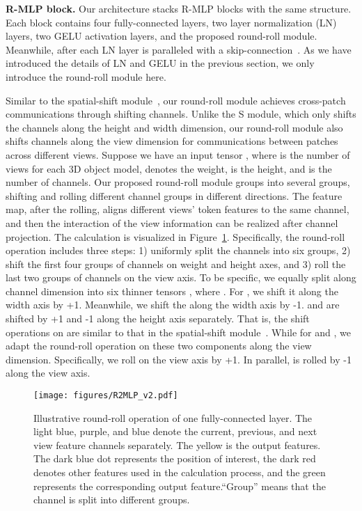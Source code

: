 \documentclass[11pt]{article}
\begin{document}
\vspace{0.2in}\noindent\textbf{R\texorpdfstring{}{\texttwosuperior}-MLP block.}
Our architecture stacks   R-MLP blocks with the same structure. Each block contains four fully-connected layers, two layer normalization (LN) layers, two GELU activation layers, and the proposed round-roll module. Meanwhile, after each LN layer is paralleled with a skip-connection~\citep{he2016deep}. As we have introduced the details of LN and GELU in the previous section,  we only introduce the round-roll module here.

Similar to the spatial-shift module~\citep{yu2022s2mlp}, our round-roll module achieves cross-patch communications through shifting channels. Unlike the S module, which only shifts the channels along the height and width dimension, our round-roll module also shifts channels along the view dimension for communications between patches across different views. Suppose we have an input tensor , where  is the number of views for each 3D object model,  denotes the weight,  is the height, and  is the number of channels.
Our proposed round-roll module groups  into several groups, shifting and rolling different channel groups in different directions. The feature map, after the rolling, aligns different views' token features to the same channel, and then the interaction of the view information can be realized after channel projection.
The calculation is visualized in Figure~\ref{fig:illustrative}.
Specifically, the round-roll operation includes three steps: 1) uniformly split the channels into six groups, 2) shift the first four groups of channels on weight and height axes, and 3) roll the last two groups of channels on the view axis. To be specific, we equally split  along channel dimension into six thinner tensors , where . For , we shift it along the width axis by +1. Meanwhile, we shift the  along the width axis by -1.  and  are shifted by +1 and -1 along the height axis separately. That is, the shift operations on  are similar to that in  the spatial-shift module~\citep{yu2022s2mlp}. While for  and , we adapt the round-roll operation on these two components along the view dimension. Specifically, we roll  on the view axis by +1. In parallel,  is rolled by -1 along the view axis.


\begin{figure}[t!]
\centering
\texttt{[image: figures/R2MLP\_v2.pdf]}
\caption{
Illustrative round-roll operation of one fully-connected layer. The light blue, purple, and blue denote the current, previous, and next view feature channels separately. The yellow is the output features. The dark blue dot represents the position of interest, the dark red denotes other features used in the calculation process, and the green represents the corresponding output feature.``Group'' means that the channel is split into different groups.
}
\label{fig:illustrative}
\end{figure}
\end{document}
